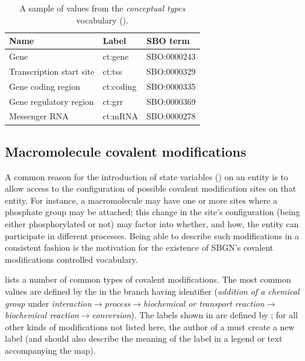 \begin{table}[h]
  \centering
  \begin{tabular}{l>{\ttfamily}l>{\ttfamily}l}
    \toprule
    \textbf{Name}              & \textbf{\rmfamily Label} & \textbf{\rmfamily SBO term} \\
    \midrule
    Gene                      & ct:gene   & SBO:0000243\\
    Transcription start site  & ct:tss    & SBO:0000329\\
    Gene coding region        & ct:coding & SBO:0000335\\
    Gene regulatory region    & ct:grr    & SBO:0000369\\
    Messenger RNA             & ct:mRNA   & SBO:0000278\\
    \bottomrule
  \end{tabular}
  \caption{A sample of values from the \emph{conceptual types} vocabulary
    ().}
  \label{tab:conceptual-types-cv}
\end{table}


\subsection{Macromolecule covalent modifications}
\label{sec:covalent-mod-cv}

A common reason for the introduction of state variables
() on an entity is to allow access to the
configuration of possible covalent modification sites on that entity.
For instance, a macromolecule may have one or more sites where a
phosphate group may be attached; this change in the site's
configuration (\ie being either phosphorylated or not) may factor into
whether, and how, the entity can participate in different processes.
Being able to describe such modifications in a consistent fashion is
the motivation for the existence of SBGN's covalent modifications
controlled vocabulary.

 lists a number of common types of covalent
modifications.  The most common values are defined by the \sbo in the
branch having identifier  (\emph{addition of a
  chemical group} under
\emph{interaction}$\rightarrow$\emph{process}$\rightarrow$\emph{biochemical
  or transport reaction}$\rightarrow$\\\emph{biochemical
  reaction}$\rightarrow$\emph{conversion}).  The labels shown in
 are defined by \SBGNPDLone; for all other kinds
of modifications not listed here, the author of a \PD must create a
new label (and should also describe the meaning of the label in a
legend or text accompanying the map).

